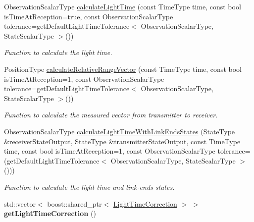 \begin{DoxyCompactItemize}
\item 
Observation\+Scalar\+Type \hyperlink{classtudat_1_1observation__models_1_1LightTimeCalculator_a443e7780033bad235680d09302998f27}{calculate\+Light\+Time} (const Time\+Type time, const bool is\+Time\+At\+Reception=true, const Observation\+Scalar\+Type tolerance=get\+Default\+Light\+Time\+Tolerance$<$ Observation\+Scalar\+Type, State\+Scalar\+Type $>$())
\begin{DoxyCompactList}\small\item\em Function to calculate the light time. \end{DoxyCompactList}\item 
Position\+Type \hyperlink{classtudat_1_1observation__models_1_1LightTimeCalculator_abd00b7606d11aa0b97a308dfada2fb1f}{calculate\+Relative\+Range\+Vector} (const Time\+Type time, const bool is\+Time\+At\+Reception=1, const Observation\+Scalar\+Type tolerance=get\+Default\+Light\+Time\+Tolerance$<$ Observation\+Scalar\+Type, State\+Scalar\+Type $>$())
\begin{DoxyCompactList}\small\item\em Function to calculate the \textquotesingle{}measured\textquotesingle{} vector from transmitter to receiver. \end{DoxyCompactList}\item 
Observation\+Scalar\+Type \hyperlink{classtudat_1_1observation__models_1_1LightTimeCalculator_a17d3bd4cb3f317531efba5880669b5d5}{calculate\+Light\+Time\+With\+Link\+Ends\+States} (State\+Type \&receiver\+State\+Output, State\+Type \&transmitter\+State\+Output, const Time\+Type time, const bool is\+Time\+At\+Reception=1, const Observation\+Scalar\+Type tolerance=(get\+Default\+Light\+Time\+Tolerance$<$ Observation\+Scalar\+Type, State\+Scalar\+Type $>$()))
\begin{DoxyCompactList}\small\item\em Function to calculate the light time and link-\/ends states. \end{DoxyCompactList}\item 
std\+::vector$<$ boost\+::shared\+\_\+ptr$<$ \hyperlink{classtudat_1_1observation__models_1_1LightTimeCorrection}{Light\+Time\+Correction} $>$ $>$ {\bfseries get\+Light\+Time\+Correction} ()\hypertarget{classtudat_1_1observation__models_1_1LightTimeCalculator_a1300c14861c693a6601927df22c78380}{}\label{classtudat_1_1observation__models_1_1LightTimeCalculator_a1300c14861c693a6601927df22c78380}

\end{DoxyCompactItemize}
